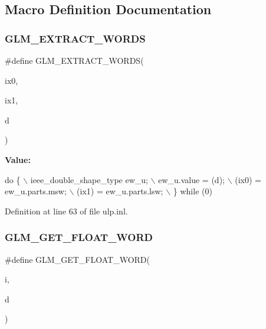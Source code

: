 \subsection{Macro Definition Documentation}
\mbox{\label{ulp_8inl_a037d712bb7eec79dcd0073eb07d3f3e8}} 
\subsubsection{\texorpdfstring{G\+L\+M\+\_\+\+E\+X\+T\+R\+A\+C\+T\+\_\+\+W\+O\+R\+DS}{GLM\_EXTRACT\_WORDS}}
{\footnotesize\ttfamily \#define G\+L\+M\+\_\+\+E\+X\+T\+R\+A\+C\+T\+\_\+\+W\+O\+R\+DS(\begin{DoxyParamCaption}\item[{}]{ix0,  }\item[{}]{ix1,  }\item[{}]{d }\end{DoxyParamCaption})}

{\bfseries Value\+:}
\begin{DoxyCode}
\textcolor{keywordflow}{do} \{                                    \(\backslash\)
        ieee\_double\_shape\_type ew\_u;        \(\backslash\)
        ew\_u.value = (d);                   \(\backslash\)
        (ix0) = ew\_u.parts.msw;             \(\backslash\)
        (ix1) = ew\_u.parts.lsw;             \(\backslash\)
    \} \textcolor{keywordflow}{while} (0)
\end{DoxyCode}


Definition at line 63 of file ulp.\+inl.

\mbox{\label{ulp_8inl_a28d9056369280955e923f99180ccb23c}} 
\subsubsection{\texorpdfstring{G\+L\+M\+\_\+\+G\+E\+T\+\_\+\+F\+L\+O\+A\+T\+\_\+\+W\+O\+RD}{GLM\_GET\_FLOAT\_WORD}}
{\footnotesize\ttfamily \#define G\+L\+M\+\_\+\+G\+E\+T\+\_\+\+F\+L\+O\+A\+T\+\_\+\+W\+O\+RD(\begin{DoxyParamCaption}\item[{}]{i,  }\item[{}]{d }\end{DoxyParamCaption})}

